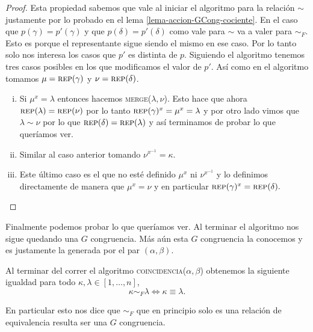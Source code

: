 \documentclass[tesis.tex]{subfiles}
\newcommand{\rep}{\textsc{rep}}
\newcommand{\coin}{\textsc{coincidencia}}
\newcommand{\mer}{\textsc{merge}}
\begin{document}
\begin{proof}
	Esta propiedad sabemos que vale al iniciar el algoritmo para la relación $\sim$ justamente por lo probado en el lema \ref{lema-accion-GCong-cociente}.
	En el caso que $p(\gamma) = p'(\gamma)$ y que $p(\delta) = p'(\delta)$ como vale para $\sim$ va a valer para $\sim_F$.
	Esto es porque el representante sigue siendo el mismo en ese caso.
	Por lo tanto solo nos interesa los casos que $p'$ es distinta de $p$.
	Siguiendo el algoritmo tenemos tres casos posibles en los que modificamos el valor de $p'$.
	Así como en el algoritmo tomamos $\mu = \rep(\gamma)$ y $\nu = \rep(\delta)$.
	\begin{enumerate}[(i).]
		\item Si $\mu^x = \lambda$ entonces hacemos \mer($\lambda, \nu$). 
		Esto hace que ahora $\rep (\lambda) = \rep (\nu)$ por lo tanto $\rep(\gamma)^x = \mu^x = \lambda $ y por otro lado vimos que $\lambda \sim \nu $ por lo que $ \rep(\delta) = \rep (\lambda)$ y así terminamos de probar lo que queríamos ver.
		\item Similar al caso anterior tomando $\nu^{x^{-1}} = \kappa$.
		\item Este último caso es el que no esté definido $\mu^x$ ni $\nu^{x^{-1}}$ y lo definimos directamente de manera que $\mu^x = \nu$ y en particular $\rep(\gamma)^x = \rep(\delta).$
	\end{enumerate}
	
	
\end{proof}


Finalmente podemos probar lo que queríamos ver.
Al terminar el algoritmo nos sigue quedando una $G$ congruencia.
Más aún esta $G$ congruencia la conocemos y es justamente la generada por el par $(\alpha, \beta)$. 

\begin{teo}
    Al terminar del correr el algoritmo \coin($\alpha, \beta$) obtenemos la siguiente igualdad para todo $\kappa, \lambda \in [1,\dots,n]$,
    \begin{equation*}
    	\kappa \sim_F \lambda \iff \kappa \equiv \lambda.
    \end{equation*}
\end{teo}

\begin{obs}
	En particular esto nos dice que $\sim_F$ que en principio solo es una relación  de equivalencia resulta ser una $G$ congruencia.
\end{obs}
\end{document}
